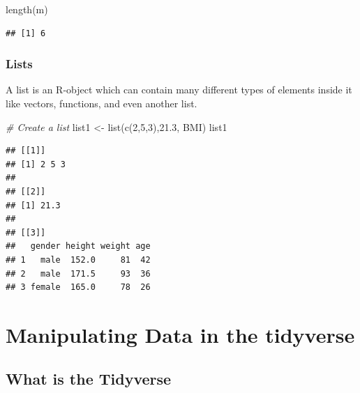 \documentclass[
]{book}
\newenvironment{Shaded}{\begin{snugshade}}{\end{snugshade}}
\newcommand{\CommentTok}[1]{\textcolor[rgb]{0.56,0.35,0.01}{\textit{#1}}}
\newcommand{\DecValTok}[1]{\textcolor[rgb]{0.00,0.00,0.81}{#1}}
\newcommand{\FloatTok}[1]{\textcolor[rgb]{0.00,0.00,0.81}{#1}}
\newcommand{\FunctionTok}[1]{\textcolor[rgb]{0.00,0.00,0.00}{#1}}
\newcommand{\NormalTok}[1]{#1}
\newcommand{\OtherTok}[1]{\textcolor[rgb]{0.56,0.35,0.01}{#1}}
\begin{document}
\begin{Shaded}
\begin{Highlighting}[]
\FunctionTok{length}\NormalTok{(m)}
\end{Highlighting}
\end{Shaded}

\begin{verbatim}
## [1] 6
\end{verbatim}

\hypertarget{lists}{%
\subsection*{Lists}\label{lists}}

A list is an R-object which can contain many different types of elements inside it like vectors, functions, and even another list.

\begin{Shaded}
\begin{Highlighting}[]
\CommentTok{\# Create a list}
\NormalTok{list1 }\OtherTok{\textless{}{-}} \FunctionTok{list}\NormalTok{(}\FunctionTok{c}\NormalTok{(}\DecValTok{2}\NormalTok{,}\DecValTok{5}\NormalTok{,}\DecValTok{3}\NormalTok{),}\FloatTok{21.3}\NormalTok{, BMI)}
\NormalTok{list1}
\end{Highlighting}
\end{Shaded}

\begin{verbatim}
## [[1]]
## [1] 2 5 3
## 
## [[2]]
## [1] 21.3
## 
## [[3]]
##   gender height weight age
## 1   male  152.0     81  42
## 2   male  171.5     93  36
## 3 female  165.0     78  26
\end{verbatim}

\hypertarget{manipulating-data-in-the-tidyverse}{%
\chapter{Manipulating Data in the tidyverse}\label{manipulating-data-in-the-tidyverse}}

\hypertarget{what-is-the-tidyverse}{%
\section{What is the Tidyverse}\label{what-is-the-tidyverse}}
\end{document}
